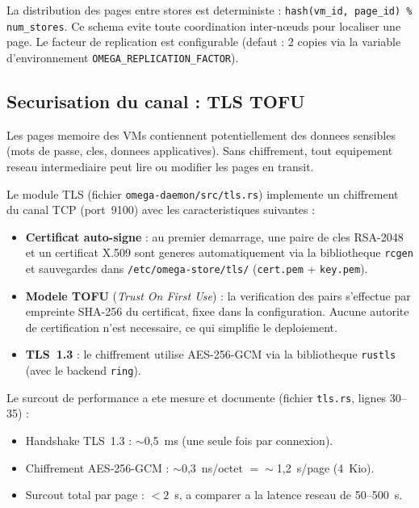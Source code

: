 La distribution des pages entre stores est deterministe : \texttt{hash(vm\_id, page\_id) \% num\_stores}. Ce schema evite toute coordination inter-nœuds pour localiser une page. Le facteur de replication est configurable (defaut : 2 copies via la variable d'environnement \texttt{OMEGA\_REPLICATION\_FACTOR}).

\subsection{Securisation du canal : TLS TOFU}
\label{subsec:tls-tofu}

Les pages memoire des VMs contiennent potentiellement des donnees sensibles (mots de passe, cles, donnees applicatives). Sans chiffrement, tout equipement reseau intermediaire peut lire ou modifier les pages en transit.

Le module TLS (fichier \texttt{omega-daemon/src/tls.rs}) implemente un chiffrement du canal TCP (port~9100) avec les caracteristiques suivantes :

\begin{itemize}
    \item \textbf{Certificat auto-signe} : au premier demarrage, une paire de cles RSA-2048 et un certificat X.509 sont generes automatiquement via la bibliotheque \texttt{rcgen} et sauvegardes dans \texttt{/etc/omega-store/tls/} (\texttt{cert.pem} + \texttt{key.pem}).
    \item \textbf{Modele TOFU} (\textit{Trust On First Use}) : la verification des pairs s'effectue par empreinte SHA-256 du certificat, fixee dans la configuration. Aucune autorite de certification n'est necessaire, ce qui simplifie le deploiement.
    \item \textbf{TLS~1.3} : le chiffrement utilise AES-256-GCM via la bibliotheque \texttt{rustls}~\cite{rustls_crate} (avec le backend \texttt{ring}).
\end{itemize}

Le surcout de performance a ete mesure et documente (fichier \texttt{tls.rs}, lignes 30--35) :

\begin{itemize}
    \item Handshake TLS~1.3 : $\sim$0,5~ms (une seule fois par connexion).
    \item Chiffrement AES-256-GCM : $\sim$0,3~ns/octet $= \sim$1,2~\textmu{}s/page (4~Kio).
    \item Surcout total par page : $< 2$~\textmu{}s, a comparer a la latence reseau de 50--500~\textmu{}s.
\end{itemize}

